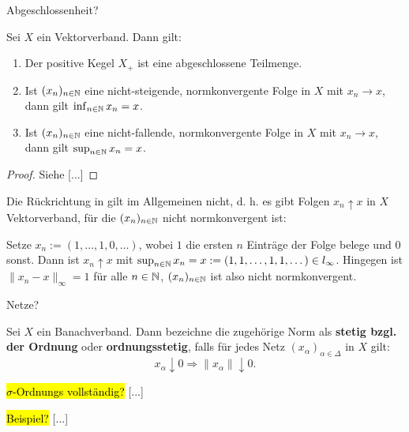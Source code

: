 \begin{defi}
Abgeschlossenheit?
\end{defi}

\begin{prop}
Sei $X$ ein Vektorverband. Dann gilt:
\begin{enumerate}
\item Der positive Kegel $X_+$ ist eine abgeschlossene Teilmenge.
\item Ist $(x_n)_{n\in\mathbb{N}}$ eine nicht-steigende, normkonvergente Folge in $X$ mit $x_n\to x$, dann  gilt $\inf_{n\in\mathbb{N}} x_n=x$.
\item Ist $(x_n)_{n\in\mathbb{N}}$ eine nicht-fallende, normkonvergente Folge in $X$ mit $x_n\to x$, dann  gilt $\sup_{n\in\mathbb{N}} x_n=x$.
\end{enumerate}
\end{prop}

\begin{proof}
Siehe \cite{} [...]
\end{proof}

\begin{bsp}
Die Rückrichtung in \Cref{} gilt im Allgemeinen nicht, d. h. es gibt Folgen $x_n\uparrow x$ in $X$ Vektorverband, für die $(x_n)_{n\in\mathbb{N}}$ nicht normkonvergent ist: 
\par
Setze $x_n:=(1,\dots, 1,0,\dots)$, wobei $1$ die ersten $n$ Einträge der Folge belege und $0$ sonst. Dann ist $x_n\uparrow x$ mit $\sup_{n\in\mathbb{N}}x_n=x:=(1,1,\dots, 1,1,\dots)\in l_\infty$. Hingegen ist $\|x_n - x\|_\infty = 1$ für alle $n\in\mathbb{N}$, $(x_n)_{n\in\mathbb{N}}$ ist also nicht normkonvergent.
\end{bsp}

\begin{defi}
Netze?
\end{defi}

\begin{defi}
Sei $X$ ein Banachverband. Dann bezeichne die zugehörige Norm als \textbf{stetig bzgl. der Ordnung} oder \textbf{ordnungsstetig}, falls für jedes Netz $(x_\alpha)_{\alpha\in\Delta}$ in $X$  gilt:
\begin{equation*}
x_\alpha\downarrow 0\Rightarrow \|x_\alpha\|\downarrow 0.
\end{equation*}
\end{defi}

\begin{defi}
\hl{$\sigma$-Ordnungs vollständig? } [...]
\end{defi}

\begin{bsp}
\hl{Beispiel?} [...]
\end{bsp}

